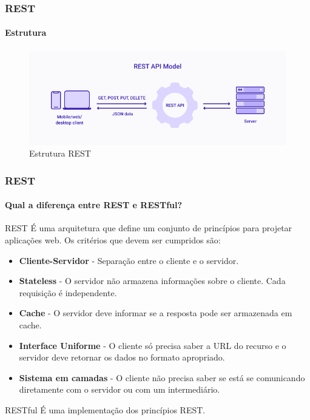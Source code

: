 \documentclass[
	9pt, %
	t, %
]{beamer}
\begin{document}
\begin{frame}
	\frametitle{REST}
	\framesubtitle{Estrutura}

	\begin{figure}
		\includegraphics[width=0.9\linewidth]{rest_estrutura.png}
		\caption{Estrutura REST}
		\label{fig:rest_structure}
	\end{figure}

\end{frame}

\begin{frame}
	\frametitle{REST}
	\framesubtitle{Qual a diferença entre REST e RESTful?}

	\begin{block}{REST}
		É uma \alert{arquitetura} que define um conjunto de princípios para projetar aplicações web.
		Os critérios que devem ser cumpridos são:
		\begin{itemize}
			\item \textbf{Cliente-Servidor} - Separação entre o cliente e o servidor.
			\item \textbf{Stateless} - O servidor não armazena informações sobre o cliente. Cada requisição é independente.
			\item \textbf{Cache} - O servidor deve informar se a resposta pode ser armazenada em cache.
			\item \textbf{Interface Uniforme} - O cliente só precisa saber a URL do recurso e o servidor deve retornar os dados no formato apropriado.
			\item \textbf{Sistema em camadas} - O cliente não precisa saber se está se comunicando diretamente com o servidor ou com um intermediário.
		\end{itemize}

	\end{block}

	\begin{block}{RESTful}
		É uma \alert{implementação} dos princípios REST.
	\end{block}

\end{frame}
\end{document}
